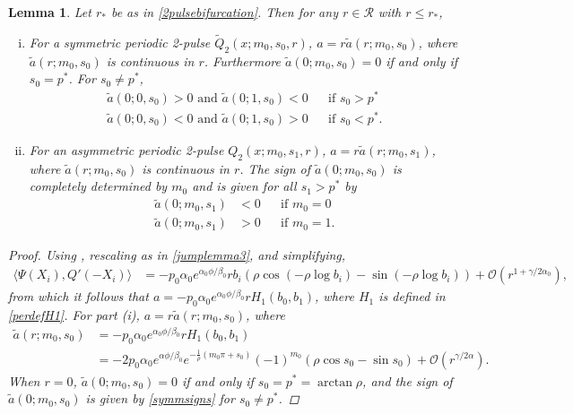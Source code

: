 \documentclass[12pt]{elsarticle}
\theoremstyle{plain}
\newtheorem{lemma}[theorem]{Lemma}
\theoremstyle{definition}
\theoremstyle{remark}
\numberwithin{theorem}{section}
\numberwithin{equation}{section}
\begin{document}
\begin{lemma}\label{lemma:chara}
Let $r_*$ be as in \cref{2pulsebifurcation}. Then for any $r \in \mathcal{R}$ with $r \leq r_*$,
\begin{enumerate}[(i)]
	\item For a symmetric periodic 2-pulse $\tilde{Q}_2(x; m_0, s_0, r)$, $a = r \tilde{a}(r; m_0, s_0)$, where $\tilde{a}(r; m_0, s_0)$ is continuous in $r$. Furthermore $\tilde{a}(0; m_0, s_0) = 0$ if and only if $s_0 = p^*$. For $s_0 \neq p^*$,
	\begin{equation}\label{symmsigns}
	\begin{aligned}
	\tilde{a}(0; 0, s_0) > 0 \text{ and } \tilde{a}(0; 1, s_0) < 0 && \text{if }s_0 > p^* \\
	\tilde{a}(0; 0, s_0) < 0 \text{ and } \tilde{a}(0; 1, s_0) > 0 && \text{if }s_0 < p^*.
	\end{aligned}
	\end{equation}

	\item For an asymmetric periodic 2-pulse $Q_2(x; m_0, s_1, r)$, $a = r \tilde{a}(r; m_0, s_1)$, where $\tilde{a}(r; m_0, s_0)$ is continuous in $r$. The sign of $\tilde{a}(0; m_0, s_0)$ is completely determined by $m_0$ and is given for all $s_1 > p^*$ by
	\begin{equation}\label{asymmsigns}
	\begin{aligned}
	\tilde{a}(0; m_0, s_1) &< 0 && \text{if }m_0 = 0 \\
	\tilde{a}(0; m_0, s_1) &> 0 && \text{if }m_0 = 1.
	\end{aligned}
	\end{equation}
\end{enumerate}	
\begin{proof}
Using \cite[Lemma 6.1(ii)]{Sandstede1998}, rescaling as in \cref{jumplemma3}, and simplifying, 
\begin{align*}
\langle \Psi(X_i), Q'(-X_i) \rangle &=
-p_0 \alpha_0 e^{\alpha_0 \phi/\beta_0} r b_i \left( \rho \cos\left(-\rho \log b_i \right) - \sin \left(-\rho \log b_i \right) \right) + \mathcal{O}(r^{1+\gamma/2\alpha_0}),
\end{align*}
from which it follows that $a = -p_0 \alpha_0 e^{\alpha_0 \phi/\beta_0} r H_1(b_0, b_1)$, where $H_1$ is defined in \cref{perdefH1}. For part (i), $a = r \tilde{a}(r; m_0, s_0)$, where
\begin{align*}
\tilde{a}(r; m_0, s_0) &= -p_0 \alpha_0 e^{\alpha_0 \phi/\beta_0} r H_1(b_0, b_1) \\
&= -2 p_0 \alpha_0 e^{\alpha \phi/\beta_0} e^{-\frac{1}{\rho}(m_0 \pi + s_0)} (-1)^{m_0} \left( \rho \cos s_0 - \sin s_0 \right) + \mathcal{O}(r^{\gamma/2\alpha}).
\end{align*}
When $r = 0$, $\tilde{a}(0; m_0, s_0) = 0$ if and only if $s_0 = p^* = \arctan \rho$, and the sign of $\tilde{a}(0; m_0, s_0)$ is given by \cref{symmsigns} for $s_0 \neq p^*$. 


\end{proof}
\end{lemma}
\end{document}
